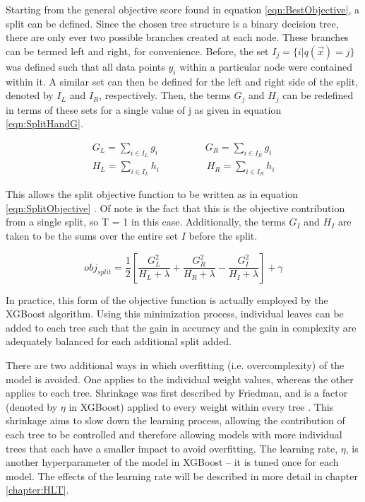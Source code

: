 \documentclass[12pt]{ucsddissertation}
\begin{document}
Starting from the general objective score found in equation \ref{eqn:BestObjective}, a split can be defined. Since the chosen tree structure is a binary decision tree, there are only ever two possible branches created at each node. These branches can be termed left and right, for convenience. Before, the set $I_j = \{i | q(\vec{x}) = j\}$ was defined such that all data points $y_i$ within a particular node were contained within it. A similar set can then be defined for the left and right side of the split, denoted by $I_L$ and $I_R$, respectively. Then, the terms $G_j$ and $H_j$ can be redefined in terms of these sets for a single value of j as given in equation \ref{eqn:SplitHandG}.

\begin{equation}\label{eqn:SplitHandG}
    \begin{split}
        G_L = \sum_{i \in I_L} g_i \hspace{2cm} G_R = \sum_{i \in I_R} g_i\\
        H_L = \sum_{i \in I_L} h_i \hspace{2cm} H_R = \sum_{i \in I_R} h_i
    \end{split}
\end{equation}

This allows the split objective function to be written as in equation \ref{eqn:SplitObjective} \cite{XGBoostPaper}. Of note is the fact that this is the objective contribution from a single split, so T = 1 in this case. Additionally, the terms $G_I$ and $H_I$ are taken to be the sums over the entire set $I$ before the split.

\begin{equation}\label{eqn:SplitObjective}
	obj_{split} = \frac{1}{2}[\frac{G^2_L}{H_L + \lambda} + \frac{G^2_R}{H_R + \lambda} - \frac{G^2_I}{H_I + \lambda}] + \gamma 
\end{equation}

In practice, this form of the objective function is actually employed by the XGBoost algorithm. Using this minimization process, individual leaves can be added to each tree such that the gain in accuracy and the gain in complexity are adequately balanced for each additional split added. 

There are two additional ways in which overfitting (i.e. overcomplexity) of the model is avoided. One applies to the individual weight values, whereas the other applies to each tree. Shrinkage was first described by Friedman, and is a factor (denoted by $\eta$ in XGBoost) applied to every weight within every tree \cite{BDTPaper}. This shrinkage aims to slow down the learning process, allowing the contribution of each tree to be controlled and therefore allowing models with more individual trees that each have a smaller impact to avoid overfitting. The learning rate, $\eta$, is another hyperparameter of the model in XGBoost -- it is tuned once for each model. The effects of the learning rate will be described in more detail in chapter \ref{chapter:HLT}. 
\end{document}

